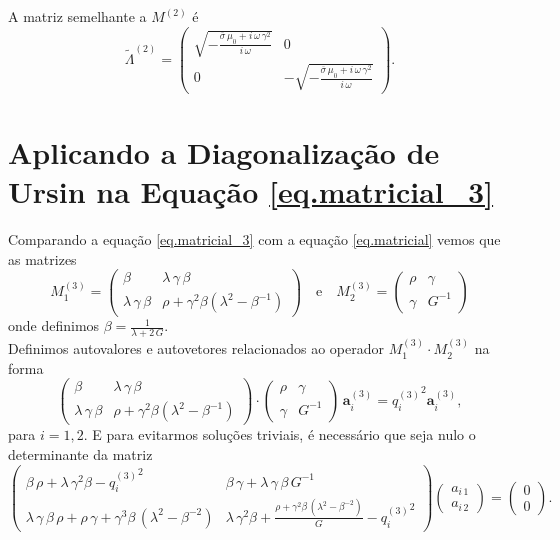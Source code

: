 A matriz semelhante a $M^{(2)}$ \'e
\begin{equation*}
\tilde{\Lambda}^{(2)}=
\begin{pmatrix}
\sqrt{-\frac{\overline{\sigma}\,\mu_0+i\,\omega\,\gamma^2}{i\,\omega}}&0\\
0&-\sqrt{-\frac{\overline{\sigma}\,\mu_0+i\,\omega\,\gamma^2}{i\,\omega}}
\end{pmatrix}.
\end{equation*}

\section{Aplicando a Diagonaliza\c{c}\~ao de Ursin na Equa\c{c}\~ao \ref{eq.matricial_3}}

Comparando a equa\c{c}\~ao \ref{eq.matricial_3} com a equa\c{c}\~ao \ref{eq.matricial} vemos que as matrizes
\begin{equation*}
M^{(3)}_1=
\begin{pmatrix}
\beta&\lambda\,\gamma\,\beta\\
\lambda\,\gamma\,\beta&\rho+\gamma^2\beta(\lambda^2-\beta^{-1})
\end{pmatrix}
\quad\text{e}\quad
M^{(3)}_2=
\begin{pmatrix}
\rho&\gamma\\
\gamma&G^{-1}
\end{pmatrix}
\end{equation*}
onde definimos $\beta=\frac{1}{\lambda+2\,G}$.\\
Definimos autovalores e autovetores relacionados ao operador $M^{(3)}_1\cdot M^{(3)}_2$ na forma
\begin{equation*}
\begin{pmatrix}
\beta&\lambda\,\gamma\,\beta\\
\lambda\,\gamma\,\beta&\rho+\gamma^2\beta(\lambda^2-\beta^{-1})
\end{pmatrix}
\cdot
\begin{pmatrix}
\rho&\gamma\\
\gamma&G^{-1}
\end{pmatrix}
\,\mathbf{a}^{(3)}_i
=
{q^{(3)}_i}^2\mathbf{a}^{(3)}_i,
\end{equation*}
para $i=1,2$.  E para evitarmos solu\c{c}\~oes triviais, \'e necess\'ario que seja nulo o determinante da matriz
\begin{equation}\label{eq.def_auto_3}
\begin{pmatrix}
\beta\,\rho+\lambda\,\gamma^2\beta-{q^{(3)}_i}^2&\beta\,\gamma+\lambda\,\gamma\,\beta\,G^{-1}\\
\lambda\,\gamma\,\beta\,\rho+\rho\,\gamma+\gamma^3\beta\,(\lambda^2-\beta^{-2})&\lambda\,\gamma^2\beta+\frac{\rho+\gamma^2\beta\,(\lambda^2-\beta^{-2})}{G}-{q^{(3)}_i}^2
\end{pmatrix}
\begin{pmatrix}
a_{i\,1}\\
a_{i\,2}
\end{pmatrix}
=
\begin{pmatrix}
0\\
0
\end{pmatrix}.
\end{equation}
